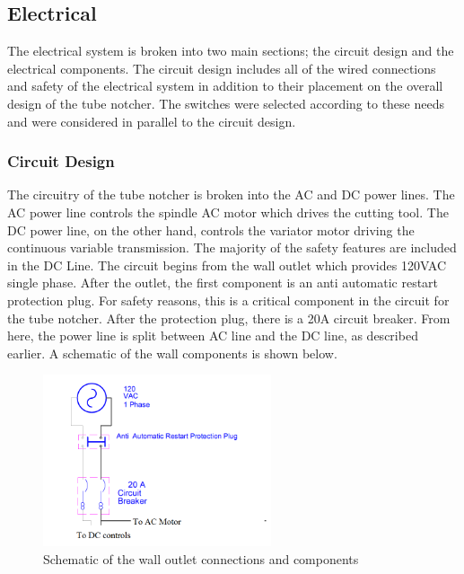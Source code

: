 \newpage

\subsection{Electrical}
The electrical system is broken into two main sections; the circuit design and the electrical components. The circuit design includes all of the wired connections and safety of the electrical system in addition to their placement on the overall design of the tube notcher. The switches were selected according to these needs and were considered in parallel to the circuit design.  
\subsubsection{Circuit Design}
The circuitry of the tube notcher is broken into the AC and DC power lines. The AC power line controls the spindle AC motor which drives the cutting tool. The DC power line, on the other hand, controls the variator motor driving the continuous variable transmission. The majority of the safety features are included in the DC Line. The circuit begins from the wall outlet which provides 120VAC single phase. After the outlet, the first component is an anti automatic restart protection plug. For safety reasons, this is a critical component in the circuit for the tube notcher. After the protection plug, there is a 20A circuit breaker. From here, the power line is split between AC line and the DC line, as described earlier. A schematic of the wall components is shown below. 

\begin{figure}[H]
    \centering
    \includegraphics[width=0.6\textwidth]{./images/Chapter2-MachineDescription/Wall}
    \caption{Schematic of the wall outlet connections and components}
    \label{fig:Electrical:Wall}
\end{figure}

